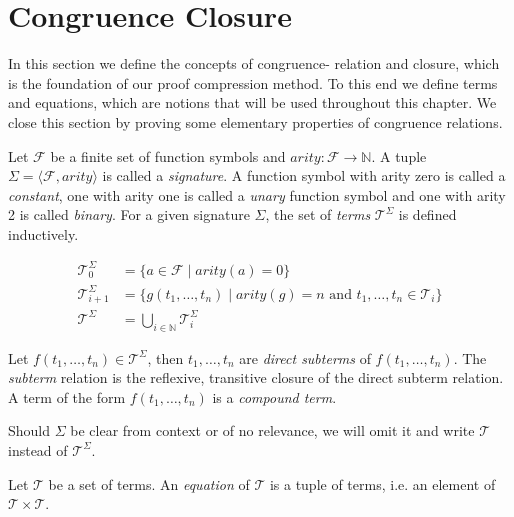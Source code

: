 \section{Congruence Closure}
\label{sec:congruencedef}

In this section we define the concepts of congruence- relation and closure, which is the foundation of our proof compression method.
To this end we define terms and equations, which are notions that will be used throughout this chapter.
We close this section by proving some elementary properties of congruence relations.

\begin{definition}

Let $\mathcal{F}$ be a finite set of function symbols and $arity: \mathcal{F} \rightarrow \mathbb{N}$.
A tuple $\Sigma = \langle \mathcal{F}, arity \rangle$ is called a \emph{signature}.
A function symbol with arity zero is called a \emph{constant}, one with arity one is called a \emph{unary} function symbol and one with arity 2 is called \emph{binary}.
For a given signature $\Sigma$, the set of \emph{terms} $\mathcal{T}^{\Sigma}$ is defined inductively.

\begin{align*}
	\mathcal{T}^{\Sigma}_0 &= \{a \in \mathcal{F} \mid arity(a) = 0\}\\
	\mathcal{T}^{\Sigma}_{i+1} &= \{g(t_1,\ldots,t_n) \mid arity(g) = n \text{ and } t_1, \ldots, t_n \in \mathcal{T}_{i}\} \\
	\mathcal{T}^{\Sigma} &= \bigcup_{i\in \mathbb{N}} \mathcal{T}^{\Sigma}_{i}
\end{align*}

\noindent Let $f(t_1,\ldots,t_n) \in \mathcal{T}^{\Sigma}$, then $t_1,\ldots,t_n$ are \emph{direct subterms} of $f(t_1,\ldots,t_n)$.
The \emph{subterm} relation is the reflexive, transitive closure of the direct subterm relation.
A term of the form $f(t_1,\ldots,t_n)$ is a \emph{compound term}.

\end{definition}

\noindent Should $\Sigma$ be clear from context or of no relevance, we will omit it and write $\mathcal{T}$ instead of $\mathcal{T}^{\Sigma}$.

\begin{definition}[Equation]

Let $\mathcal{T}$ be a set of terms.
An \emph{equation} of $\mathcal{T}$ is a tuple of terms, i.e. an element of $\mathcal{T} \times \mathcal{T}$.

\end{definition}

